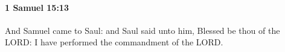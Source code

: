 
		\paragraph{1 Samuel 15:13} %
			\label{1SAMUEL-15-13}

			And Samuel came to Saul: and Saul said unto him, Blessed be thou of the LORD: I have performed the commandment of the LORD.


